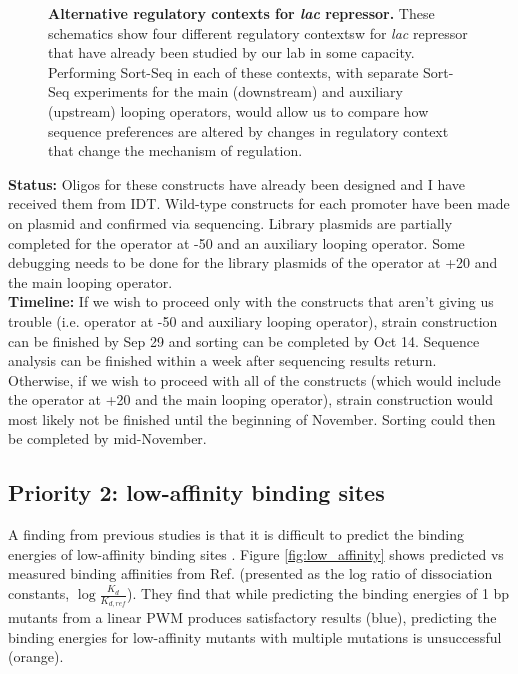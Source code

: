 \documentclass[10pt,letterpaper]{article}
\begin{document}
\begin{figure}[ht!]
\begin{center}
\caption{\textbf{Alternative regulatory contexts for \textit{lac} repressor.} These schematics show four different regulatory contextsw for \textit{lac} repressor that have already been studied by our lab in some capacity. Performing Sort-Seq in each of these contexts, with separate Sort-Seq experiments for the main (downstream) and auxiliary (upstream) looping operators, would allow us to compare how sequence preferences are altered by changes in regulatory context that change the mechanism of regulation.}
\label{fig:reg_contexts}
\end{center}
\end{figure}

\noindent \textbf{Status:} Oligos for these constructs have already been designed and I
have received them from IDT. Wild-type constructs for each promoter have been
made on plasmid and confirmed via sequencing. Library plasmids are partially completed for the operator at -50 and an auxiliary looping operator. Some debugging needs to be done for the library plasmids of the operator at +20 and the main looping operator.\\

\noindent \textbf{Timeline:} If we wish to proceed only with the constructs that aren't giving us trouble (i.e. operator at -50 and auxiliary looping operator), strain construction can be finished by Sep 29 and sorting can be completed by Oct 14. Sequence analysis can be finished
within a week after sequencing results return.\\

\noindent Otherwise, if we wish to proceed with all of the constructs (which would include the operator at +20 and the main looping operator), strain construction would most likely not be finished until the beginning of November. Sorting could then be completed by mid-November.

\subsection*{Priority 2: low-affinity binding sites}

A finding from previous studies is that it is difficult to predict the
binding energies of low-affinity binding sites \cite{Zuo2014, Maerkl2007, Siebert2016}. Figure \ref{fig:low_affinity} shows predicted vs measured binding
affinities from Ref. \cite{Siebert2016}(presented as the log ratio of dissociation constants, $\log{\frac{K_d}{K_{d, ref}}}$). They find that while predicting the binding energies of 1 bp mutants from a linear PWM produces satisfactory results (blue), predicting the binding energies for low-affinity mutants with multiple mutations is unsuccessful (orange). \\
\end{document}
